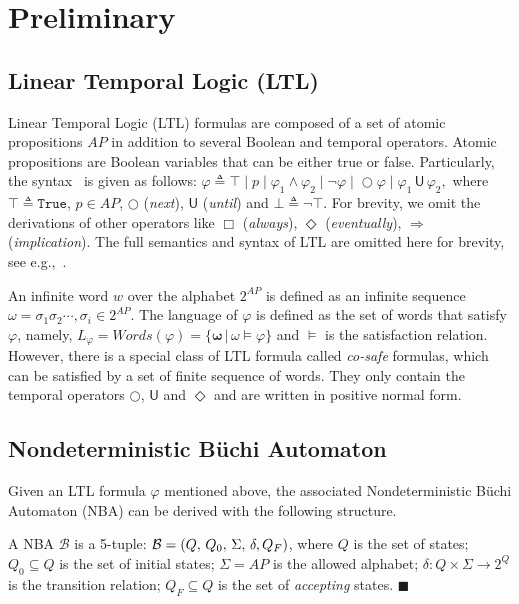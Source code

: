 \section{Preliminary}\label{sec:preliminary}
\subsection{Linear Temporal Logic (LTL)}\label{subsec:LTL}
Linear Temporal Logic (LTL) formulas are composed of a set of atomic propositions $AP$
in addition to several Boolean and temporal operators. Atomic propositions are Boolean variables that can
be either true or false.  Particularly, the syntax~\citep{baier2008principles} is given as follows:
$\varphi \triangleq \top \;|\; p  \;|\; \varphi_1 \wedge \varphi_2  \;|\; \neg \varphi  \;|\; \bigcirc \varphi  \;|\;  \varphi_1 \,\textsf{U}\, \varphi_2,$
where $\top\triangleq \texttt{True}$, $p \in AP$, $\bigcirc$ (\emph{next}),
$\textsf{U}$ (\emph{until}) and $\bot\triangleq \neg \top$.
For brevity, we omit the derivations of other operators like $\Box$ (\emph{always}),
 $\Diamond$ (\emph{eventually}), $\Rightarrow$ (\emph{implication}).
The full semantics and syntax of LTL are omitted here for brevity,
see e.g.,~\citep{baier2008principles}.

An infinite {word} $w$ over the alphabet $2^{AP}$ is defined as an
infinite sequence ${\omega}=\sigma_1\sigma_2\cdots, \sigma_i\in 2^{AP}$.
The language of $\varphi$ is defined as the set of words that satisfy $\varphi$,
namely, $L_\varphi=Words(\varphi)=\{\boldsymbol{\omega}\,|\,\omega\models\varphi\}$
and $\models$ is the satisfaction relation.
However, there is a special class of LTL formula called \emph{co-safe} formulas,
which can be satisfied by a set of finite sequence of words.
They only contain the temporal operators $\bigcirc$, $\textsf{U}$ and $\Diamond$
 and are written in positive normal form.

\subsection{Nondeterministic B\"uchi Automaton}\label{subsec:nba}

Given an LTL formula $\varphi$ mentioned above, the associated Nondeterministic B\"{u}chi Automaton (NBA) can be derived with the following structure.
\begin{definition}[NBA] \label{def:nba}
A NBA $\mathcal{B}$ is a 5-tuple: $\mathcal{B}=(Q,\,Q_0,\,\Sigma,\,\delta,\,\\Q_F)$,
where $Q$ is the set of states;
$Q_0\subseteq Q$ is the set of initial states;
$\Sigma=AP$ is the allowed alphabet;
$\delta:Q\times \Sigma\rightarrow2^{Q}$ is the transition relation;
$Q_F\subseteq Q$ is the set of \emph{accepting} states. \hfill $\blacksquare$
\end{definition}

